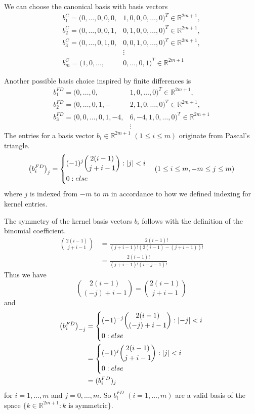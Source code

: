 \documentclass[twoside,a4paper]{article}
\begin{document}
We can choose the canonical basis with basis vectors
\begin{align*}
	b_1^C = (0, \dots, 0, 0, 0, &1, 0, 0, 0, \dots, 0)^T \in \mathbb{R}^{2m+1}, \\
	b_2^C = (0, \dots, 0, 0, 1, &0, 1, 0, 0, \dots, 0)^T \in \mathbb{R}^{2m+1}, \\
	b_3^C = (0, \dots, 0, 1, 0, &0, 0, 1, 0, \dots, 0)^T \in \mathbb{R}^{2m+1}, \\
	&\vdots \\
	b_m^C = (1, 0, \dots, &0, \dots, 0, 1)^T \in \mathbb{R}^{2m+1}
\end{align*}

Another possible basis choice inspired by finite differences is
\begin{align*}
	b_1^{FD} = (0, \dots, 0,& 1,0, \dots, 0)^T \in \mathbb{R}^{2m+1},\\
	b_2^{FD} = (0, \dots, 0, 1,-&2,1, 0, \dots, 0)^T \in \mathbb{R}^{2m+1},\\
	b_3^{FD} = (0, 0, \dots, 0, 1,-4,& 6,-4,1, 0, \dots, 0)^T \in \mathbb{R}^{2m+1} \\
	&\vdots
\end{align*}
The entries for a basis vector $b_i \in \mathbb{R}^{2m+1}$ $(1 \leq i \leq m)$ 
originate from Pascal's triangle.
\begin{equation*}
	\left( b_i^{FD} \right)_j = \begin{dcases}
		(-1)^j \binom{2(i-1)}{j+i-1} : \left|{j}\right| < i \\
		0 : else
	\end{dcases}
	\quad (1 \leq i \leq m, -m \leq j \leq m )
\end{equation*}
where $j$ is indexed from $-m$ to $m$ in accordance to how we defined indexing for kernel entries.

The symmetry of the kernel basis vectors $b_i$ follows with the definition of the binomial coefficient.
\begin{align*}
	\binom{2(i-1)}{j+i-1} &= \frac{2(i-1)!}{(j+i-1)!(2(i-1)-(j+i-1))!} \\
	&= \frac{2(i-1)!}{(j+i-1)!(i-j-1)!}
\end{align*}
Thus we have
\begin{equation*}
	\binom{2(i-1)}{(-j)+i-1} = \binom{2(i-1)}{j+i-1}
\end{equation*}
and
\begin{align*}
	\left( b_i^{FD} \right)_{-j} &= \begin{dcases}
		(-1)^{-j} \binom{2(i-1)}{(-j)+i-1} : \left|{-j}\right| < i \\
		0 : else
	\end{dcases} \\
	&= \begin{dcases}
		(-1)^{j} \binom{2(i-1)}{j+i-1} : \left|{j}\right| < i \\
		0 : else
	\end{dcases} \\
	&= (b_i^{FD})_j
\end{align*}
for $i=1, \dots, m$ and $j= 0, \dots, m$. So $b_i^{FD}$ $(i=1, \dots, m)$ are a valid basis of
the space $\{ k \in \mathbb{R}^{2m+1} : k \text{ is symmetric} \}$.
\end{document}

